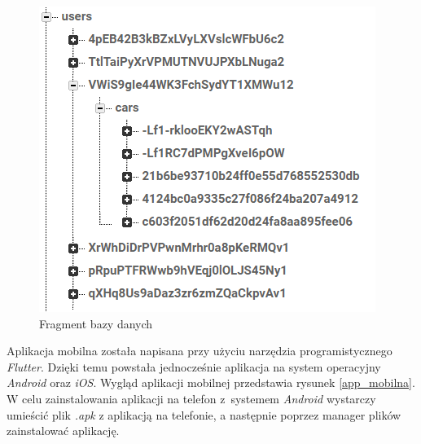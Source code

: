 \documentclass[12pt]{article}
\begin{document}
	\begin{figure}[H]
		\centering
		\includegraphics[scale=1]{baza_danych.png}
		\caption{Fragment bazy danych}
		\label{baza}
	\end{figure}

Aplikacja mobilna została napisana przy użyciu narzędzia programistycznego \textit{Flutter}. Dzięki temu powstała jednocześnie aplikacja na system operacyjny \textit{Android} oraz \textit{iOS}. Wygląd aplikacji mobilnej przedstawia rysunek \ref{app_mobilna}. W celu zainstalowania aplikacji na telefon z~systemem \textit{Android} wystarczy umieścić plik \textit{.apk} z aplikacją na telefonie, a następnie poprzez manager plików zainstalować aplikację.
\end{document}

